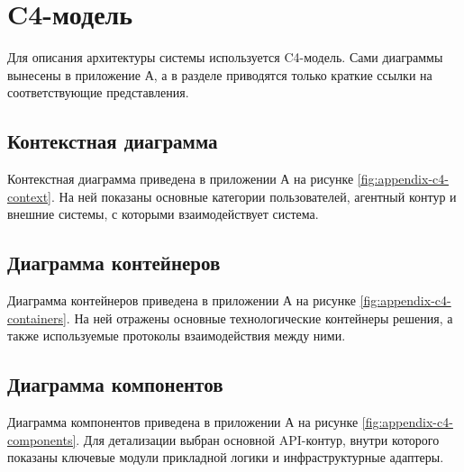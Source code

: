 \section{C4-модель}
\headingtextsep

Для описания архитектуры системы используется C4-модель. Сами диаграммы вынесены в приложение А, а в разделе приводятся только краткие ссылки на соответствующие представления.

\textheadingsep
\subsection{Контекстная диаграмма}
\headingtextsep

Контекстная диаграмма приведена в приложении А на рисунке \ref{fig:appendix-c4-context}. На ней показаны основные категории пользователей, агентный контур и внешние системы, с которыми взаимодействует система.

\textheadingsep
\subsection{Диаграмма контейнеров}
\headingtextsep

Диаграмма контейнеров приведена в приложении А на рисунке \ref{fig:appendix-c4-containers}. На ней отражены основные технологические контейнеры решения, а также используемые протоколы взаимодействия между ними.

\textheadingsep
\subsection{Диаграмма компонентов}
\headingtextsep

Диаграмма компонентов приведена в приложении А на рисунке \ref{fig:appendix-c4-components}. Для детализации выбран основной API-контур, внутри которого показаны ключевые модули прикладной логики и инфраструктурные адаптеры.